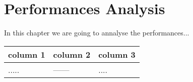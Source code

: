 \section{Performances Analysis}
In this chapter we are going to annalyse the performances...

\begin{center}
    \begin{tabular}{ | p{4.8cm} | p{4.8cm} | p{4.8cm} |}
    \hline
       \textbf{column 1}
         & \textbf{column 2}
         & \textbf{column 3}\\ \hline \hline
       .....
         & ------
         & .... \\ \hline
     \end{tabular}
\end{center}
